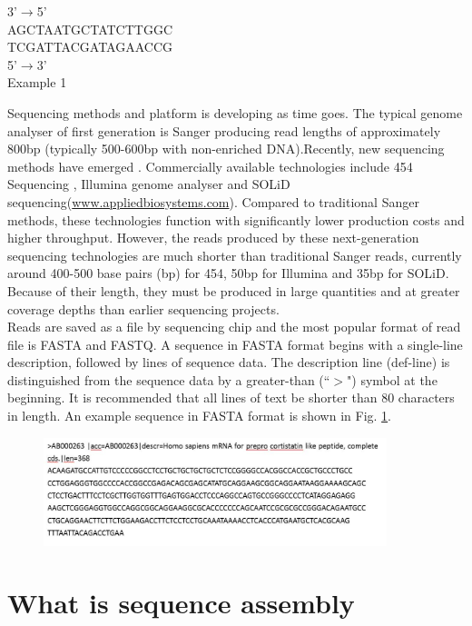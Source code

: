 \documentclass{article}
\begin{document}
\begin{center}
  3'$\rightarrow$5'\\
  {\color{red}AGCTAA}TGCTATCTTGGC\\
  TCGATTACGATAG{\color{red}AACCG}\\
  5'$\rightarrow$3'\\
  Example 1\\
\end{center}
Sequencing methods and platform is developing as time goes. The typical genome analyser of first generation is Sanger\cite{sanger1977nucleotide} producing read lengths of approximately 800bp (typically 500-600bp with non-enriched DNA).Recently, new sequencing methods have emerged \cite{mardis2008impact}. Commercially available technologies include 454 Sequencing \cite{margulies2005genome}, Illumina genome analyser \cite{bentley2006whole} and SOLiD sequencing(\href{www.appliedbiosystems.com}{www.appliedbiosystems.com}). Compared to traditional Sanger methods, these technologies function with significantly lower production costs and higher throughput. However, the reads produced by these next-generation sequencing technologies are much shorter than traditional Sanger reads, currently around 400-500 base pairs (bp) for 454, 50bp for Illumina and 35bp for SOLiD. Because of their length, they must be produced in large quantities and at greater coverage depths than earlier sequencing projects.\\
Reads are saved as a file by sequencing chip and the most popular format of read file is FASTA and FASTQ. A sequence in FASTA format begins with a single-line description, followed by lines of sequence data. The description line (def-line) is distinguished from the sequence data by a greater-than (``$>$") symbol at the beginning. It is recommended that all lines of text be shorter than 80 characters in length. An example sequence in FASTA format is shown in Fig. \ref{fasta_format}.
\begin{figure}[ht]
  \centering
  \includegraphics[width=10cm]{Figure2.jpg}\\
  \caption{}\label{fasta_format}
\end{figure}


\section{What is sequence assembly}

\renewcommand\refname{Reference}


\end{document}
